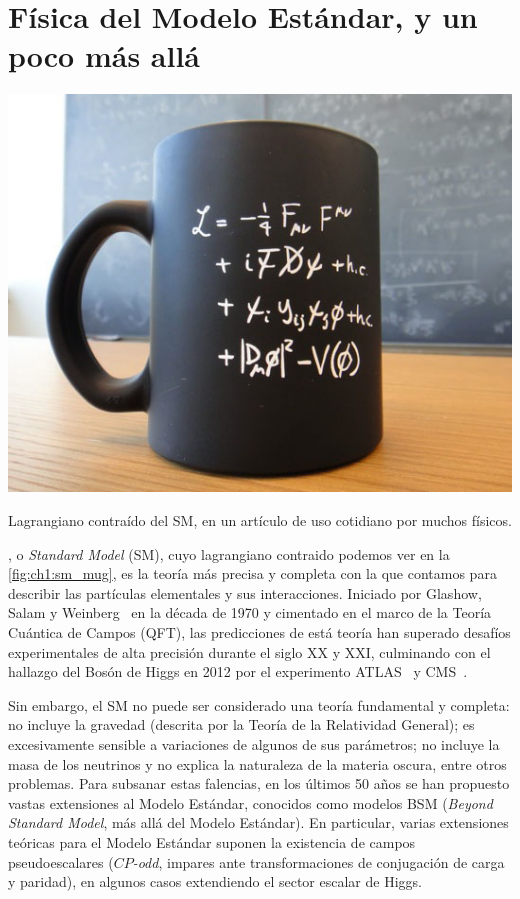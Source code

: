 \chapter{Física del Modelo Estándar, y un poco más allá} \label{chap:ch1}

\begin{marginfigure}[27em]
    \includegraphics[width=0.99\linewidth]{Assets/Images/sm_mug.jpg}
    \caption{Lagrangiano contraído del SM, en un artículo de uso cotidiano por muchos físicos.}
    \label{fig:ch1:sm_mug}
\end{marginfigure}

, o \textit{Standard Model} (SM), cuyo lagrangiano contraido podemos ver en la \cref{fig:ch1:sm_mug}, es la teoría más precisa y completa con la que contamos para describir las partículas elementales y sus interacciones. Iniciado por Glashow, Salam y Weinberg~\cite{Glashow1961,Weinberg1967,Salam1959} en la década de 1970 y cimentado en el marco de la Teoría Cuántica de Campos (QFT), las predicciones de está teoría han superado desafíos experimentales de alta precisión durante el siglo XX y XXI, culminando con el hallazgo del Bosón de Higgs en 2012 por el experimento ATLAS~\cite{TheATLASCollaboration2012} y CMS~\cite{TheCMSCollaboration2012}.

Sin embargo, el SM no puede ser considerado una teoría fundamental y completa: no incluye la gravedad (descrita por la Teoría de la Relatividad General); es excesivamente sensible a variaciones de algunos de sus parámetros; no incluye la masa de los neutrinos y no explica la naturaleza de la materia oscura, entre otros problemas. Para subsanar estas falencias, en los últimos 50 años se han propuesto vastas extensiones al Modelo Estándar, conocidos como modelos BSM (\textit{Beyond Standard Model}, más allá del Modelo Estándar). En particular, varias extensiones teóricas para el Modelo Estándar suponen la existencia de campos pseudoescalares (\textit{$CP$-odd}, impares ante transformaciones de conjugación de carga y paridad), en algunos casos extendiendo el sector escalar de Higgs.

